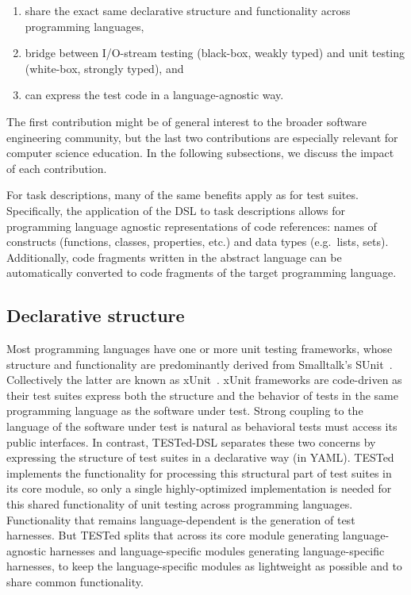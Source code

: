 \documentclass[../main]{subfiles}
\begin{document}
\begin{enumerate}
    \item share the exact same declarative structure and functionality across programming languages,
    \item bridge between I/O-stream testing (black-box, weakly typed) and unit testing (white-box, strongly typed), and
    \item can express the test code in a language-agnostic way.
\end{enumerate}

The first contribution might be of general interest to the broader software engineering community, but the last two contributions are especially relevant for computer science education.
In the following subsections, we discuss the impact of each contribution.

For task descriptions, many of the same benefits apply as for test suites.
Specifically, the application of the DSL to task descriptions allows for programming language agnostic representations of code references: names of constructs (functions, classes, properties, etc.) and data types (e.g.\ lists, sets).
Additionally, code fragments written in the abstract language can be automatically converted to code fragments of the target programming language.

\subsection{Declarative structure}\label{subsec:dsl-declarative-structure}

Most programming languages have one or more unit testing frameworks, whose structure and functionality are predominantly derived from Smalltalk's SUnit~\autocite{beckSimpleSmalltalkTesting1997}.
Collectively the latter are known as xUnit~\autocite{meszarosXUnitTestPatterns2007}.
xUnit frameworks are code-driven as their test suites express both the structure and the behavior of tests in the same programming language as the software under test.
Strong coupling to the language of the software under test is natural as behavioral tests must access its public interfaces.
In contrast, TESTed-DSL separates these two concerns by expressing the structure of test suites in a declarative way (in YAML).
TESTed implements the functionality for processing this structural part of test suites in its core module, so only a single highly-optimized implementation is needed for this shared functionality of unit testing across programming languages.
Functionality that remains language-dependent is the generation of test harnesses.
But TESTed splits that across its core module generating language-agnostic harnesses and language-specific modules generating language-specific harnesses, to keep the language-specific modules as lightweight as possible and to share common functionality.
\end{document}
